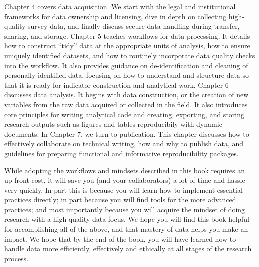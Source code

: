 Chapter 4 covers data acquisition. We start with
the legal and institutional frameworks for data ownership and licensing,
dive in depth on collecting high-quality survey data,
and finally discuss secure data handling during transfer, sharing, and storage.
Chapter 5 teaches workflows for data processing.
It details how to construct ``tidy'' data at the appropriate units of analysis,
how to ensure uniquely identified datasets, and
how to routinely incorporate data quality checks into the workflow.
It also provides guidance on de-identification and cleaning of personally-identified data,
focusing on how to understand and structure data
so that it is ready for indicator construction and analytical work.
Chapter 6 discusses data analysis.
It begins with data construction, or the creation of new variables
from the raw data acquired or collected in the field.
It also introduces core principles for writing analytical code
and creating, exporting, and storing research outputs such as figures and tables reproducibily with dynamic documents.
In Chapter 7, we turn to publication.
This chapter discusses
how to effectively collaborate on technical writing,
how and why to publish data,
and guidelines for preparing functional and informative reproducibility packages.

While adopting the workflows and mindsets described in this book requires an up-front cost,
it will save you (and your collaborators) a lot of time and hassle very quickly.
In part this is because you will learn how to implement essential practices directly;
in part because you will find tools for the more advanced practices;
and most importantly because you will acquire the mindset of doing research with a high-quality data focus.
We hope you will find this book helpful for accomplishing all of the above,
and that mastery of data helps you make an impact.
We hope that by the end of the book,
you will have learned how to handle data more efficiently, effectively and ethically
at all stages of the research process.

\mainmatter

